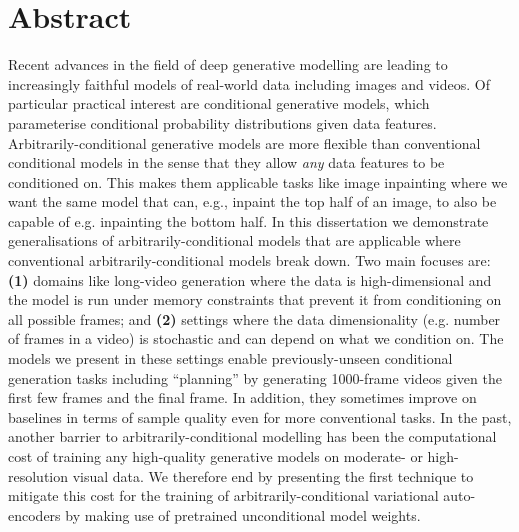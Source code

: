 
\chapter{Abstract}

Recent advances in the field of deep generative modelling are leading to increasingly faithful models of real-world data including images and videos. Of particular practical interest are conditional generative models, which parameterise conditional probability distributions given data features.
%
Arbitrarily-conditional generative models are more flexible than conventional conditional models in the sense that they allow \textit{any} data features to be conditioned on. This makes them applicable tasks like image inpainting where we want the same model that can, e.g., inpaint the top half of an image, to also be capable of e.g. inpainting the bottom half.
%
In this dissertation we demonstrate generalisations of arbitrarily-conditional models that are applicable where conventional arbitrarily-conditional models break down. Two main focuses are: \textbf{(1)} domains like long-video generation where the data is high-dimensional and the model is run under memory constraints that prevent it from conditioning on all possible frames; and \textbf{(2)} settings where the data dimensionality (e.g. number of frames in a video) is stochastic and can depend on what we condition on. 
%
%
The models we present in these settings enable previously-unseen conditional generation tasks including ``planning'' by generating 1000-frame videos given the first few frames and the final frame. In addition, they sometimes improve on baselines in terms of sample quality even for more conventional tasks.
%
In the past, another barrier to arbitrarily-conditional modelling has been the computational cost of training any high-quality generative models on moderate- or high-resolution visual data. We therefore end by presenting the first technique to mitigate this cost for the training of arbitrarily-conditional variational auto-encoders by making use of pretrained unconditional model weights.



